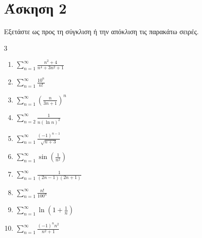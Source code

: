 \documentclass[11pt,a4paper]{article}
\begin{document}
\section*{Άσκηση 2}
Εξετάστε ως προς τη σύγκλιση ή την απόκλιση τις παρακάτω σειρές.
\begin{multicols}{3}
\begin{enumerate}
    \item $\displaystyle\sum_{n=1}^{\infty} \frac{n^2 + 4}{n^4 + 3n^2 + 1}$
    \item $\displaystyle\sum_{n=1}^{\infty} \frac{10^n}{n!}$
    \item $\displaystyle\sum_{n=1}^{\infty} \left( \frac{n}{3n+1} \right)^n$
    \item $\displaystyle\sum_{n=2}^{\infty} \frac{1}{n (\ln n)^2}$
    \item $\displaystyle\sum_{n=1}^{\infty} \frac{(-1)^{n-1}}{\sqrt{n+3}}$
    \item $\displaystyle\sum_{n=1}^{\infty} \sin\left( \frac{1}{n^2} \right)$
    \item $\displaystyle\sum_{n=1}^{\infty} \frac{1}{(2n-1)(2n+1)}$
    \item $\displaystyle\sum_{n=1}^{\infty} \frac{n!}{100^n}$
    \item $\displaystyle\sum_{n=1}^{\infty} \ln\left( 1 + \frac{1}{n} \right)$
    \item $\displaystyle\sum_{n=1}^{\infty} \frac{(-1)^n n^2}{n^2 + 1}$
\end{enumerate}
\end{multicols}
\end{document}
